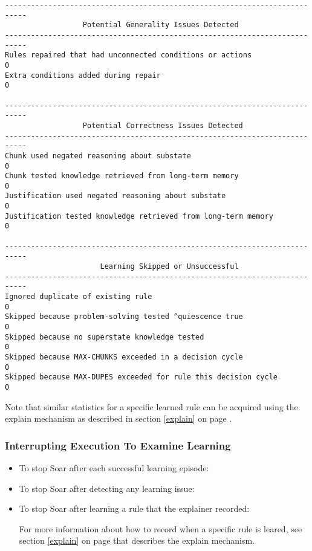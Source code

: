 \begin{center}
{\begin{verbatim}
---------------------------------------------------------------------------
                  Potential Generality Issues Detected
---------------------------------------------------------------------------
Rules repaired that had unconnected conditions or actions              0
Extra conditions added during repair                                   0

---------------------------------------------------------------------------
                  Potential Correctness Issues Detected
---------------------------------------------------------------------------
Chunk used negated reasoning about substate                            0
Chunk tested knowledge retrieved from long-term memory                 0
Justification used negated reasoning about substate                    0
Justification tested knowledge retrieved from long-term memory         0

---------------------------------------------------------------------------
                      Learning Skipped or Unsuccessful
---------------------------------------------------------------------------
Ignored duplicate of existing rule                                     0
Skipped because problem-solving tested ^quiescence true                0
Skipped because no superstate knowledge tested                         0
Skipped because MAX-CHUNKS exceeded in a decision cycle                0
Skipped because MAX-DUPES exceeded for rule this decision cycle        0
\end{verbatim}
}
\end{center}

Note that similar statistics for a specific learned rule can be acquired using the explain mechanism as described in section \ref{explain} on page \pageref{explain}.

\subsubsection{Interrupting Execution To Examine Learning}

\begin{itemize}
	\item To stop Soar after each successful learning episode: \newline {} 
	\item To stop Soar after detecting any learning issue: \newline {} 
	\item To stop Soar after learning a rule that the explainer recorded: \newline {} 

For more information about how to record when a specific rule is leared, see section \ref{explain} on page \pageref{explain} that describes the explain mechanism.

\end{itemize}


